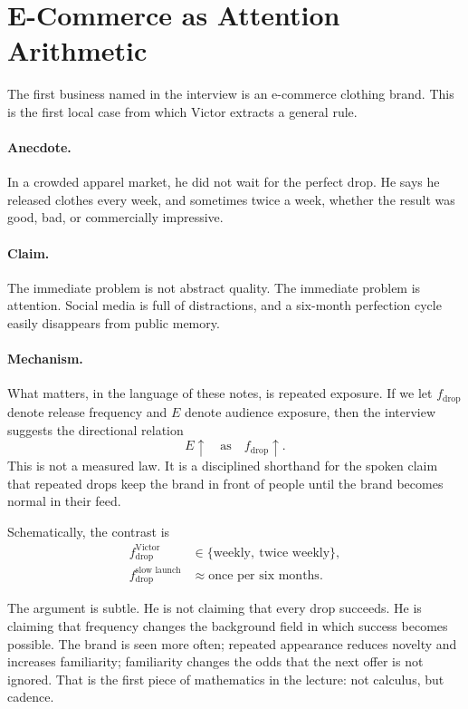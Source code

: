\section{E-Commerce as Attention Arithmetic}

The first business named in the interview is an e-commerce clothing brand. This is the first local case from which Victor extracts a general rule.

\paragraph{Anecdote.}
In a crowded apparel market, he did not wait for the perfect drop. He says he released clothes every week, and sometimes twice a week, whether the result was good, bad, or commercially impressive.

\paragraph{Claim.}
The immediate problem is not abstract quality. The immediate problem is attention. Social media is full of distractions, and a six-month perfection cycle easily disappears from public memory.

\paragraph{Mechanism.}
What matters, in the language of these notes, is repeated exposure. If we let \(f_{\text{drop}}\) denote release frequency and \(E\) denote audience exposure, then the interview suggests the directional relation
\begin{equation}
E \uparrow \quad \text{as} \quad f_{\text{drop}} \uparrow.
\end{equation}
This is not a measured law. It is a disciplined shorthand for the spoken claim that repeated drops keep the brand in front of people until the brand becomes normal in their feed.

Schematically, the contrast is
\begin{align}
f_{\text{drop}}^{\text{Victor}} &\in \{\text{weekly},\ \text{twice weekly}\}, \\
f_{\text{drop}}^{\text{slow launch}} &\approx \text{once per six months}.
\end{align}

The argument is subtle. He is not claiming that every drop succeeds. He is claiming that frequency changes the background field in which success becomes possible. The brand is seen more often; repeated appearance reduces novelty and increases familiarity; familiarity changes the odds that the next offer is not ignored. That is the first piece of mathematics in the lecture: not calculus, but cadence.

